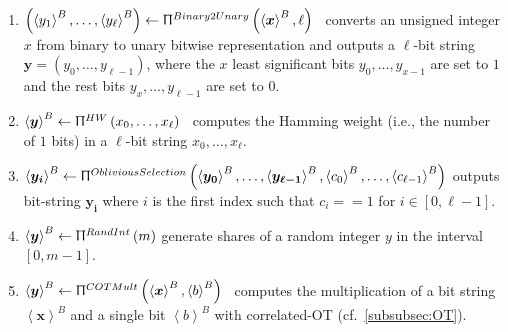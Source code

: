 \begin{enumerate}
      \item $\left(\left\langle y_1\right\rangle^B,\ldots,\left\langle y_{\ell}\right\rangle^B \right)\gets\Uppi^{Binary2Unary}\left(\left\langle \boldsymbol{x}\right\rangle ^{B},\ell\right) $~\cite{aliasgari2012secure} converts an unsigned integer $x$ from binary to unary bitwise representation and outputs a $\ell$-bit string $\boldsymbol{y}=\left( y_{0} ,\ldots , y_{\ell-1} \right) $, where the $x$ least significant bits $ y_{0} ,\ldots , y_{x-1} $ are set to $1$ and the rest bits $ y_{x} ,\ldots , y_{\ell-1} $ are set to $0$.



      \item $\left\langle \boldsymbol{y}\right\rangle ^{B}\gets \Uppi^{HW}\left(x_0,\ldots,x_{\ell}\right) $~\cite{boyar2008tight} computes the Hamming weight (i.e., the number of $1$ bits) in a $\ell$-bit string $x_0,\ldots,x_{\ell}$.

      \item $\left\langle \boldsymbol{y_i}\right\rangle ^{B}\gets \Uppi^{ObliviousSelection}\left(\left\langle \boldsymbol{y_0}\right\rangle^{B} ,\ldots,\left\langle \boldsymbol{y_{\ell-1}}\right\rangle^{B},\left\langle c_0\right\rangle ^B,\ldots,\left\langle c_{\ell-1}\right\rangle ^B\right) $ outputs bit-string $\boldsymbol{y_i}$ where $i$ is the first index such that $c_{i}==1$ for $i\in \left[0,\ell-1\right] $.

      \item $\left\langle \boldsymbol{y}\right\rangle ^{B} \gets \Uppi^{RandInt}\left(m\right) $ generate shares of a random integer $y$ in the interval $ \left[0,m-1\right] $.

      \item $\left\langle \boldsymbol{y}\right\rangle^B \gets \Uppi^{COTMult}\left(\left\langle \boldsymbol{x}\right\rangle ^B,\left\langle b\right\rangle ^B\right) $~\cite{asharov2018privacy,schneider2019episode} computes the multiplication of a bit string $\left\langle \boldsymbol{x}\right\rangle ^B$ and a single bit $\left\langle b\right\rangle ^B$ with correlated-OT (cf.~\autoref{subsubsec:OT}).


\end{enumerate}

